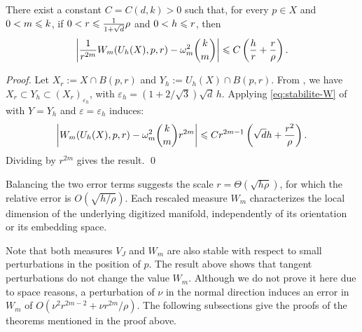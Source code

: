 \begin{theorem}
\label{thm:main}
There exist a constant $C=C(d,k)>0$ such that, for every $p \in X$ and $0<m\leqslant k$, if $0<r\leqslant \frac{1}{1+\sqrt{d}}\rho$ and $0<h\leqslant r$, then
\begin{align}\label{eq:main}
  \left| \frac{1}{r^{2m}}W_m(U_h(X),p,r) - \omega_m^2\binom{k}{m} \right|
  \leqslant  C \left( \frac{h}{r} + \frac{r}{\rho} \right).
\end{align}
\end{theorem}
\begin{proof}
  Let $X_r:= X \cap B(p,r)$ and $Y_h:=U_h(X) \cap
  B(p,r)$. From , we have $X_r
  \subset Y_h \subset (X_r)_{\varepsilon_h}$, with
  $\varepsilon_h=(1+2/\sqrt{3})\sqrt d\,h$. Applying \eqref{eq:stabilite-W} of
   with $Y=Y_h$ and
  $\varepsilon=\varepsilon_h$ induces:
  \begin{equation*}
    \left| W_m(U_h(X),p,r)-\omega_m^2\binom{k}{m}r^{2m} \right|
    \leqslant C r^{2m-1} \left( \sqrt{d} h+\frac{r^2}{\rho} \right).
  \end{equation*}
  Dividing by $r^{2m}$ gives the result.
  \qed
\end{proof}
Balancing the two error terms suggests the scale
$r=\Theta(\sqrt{h\rho})$, for which the relative error is
$O(\sqrt{h/\rho})$. Each rescaled measure $W_m$ characterizes the local
dimension of the underlying digitized manifold, independently of its
orientation or its embedding space.


Note that both measures $V_J$ and $W_m$ are also stable with respect
to small perturbations in the position of $p$. The result above shows
that tangent perturbations do not change the value $W_m$. Although we
do not prove it here due to space reasons, a perturbation of $\nu$ in
the normal direction induces an error in $W_m$ of $O(\nu^2
r^{2m-2}+\nu r^{2m} / \rho)$. The following subsections give the
proofs of the theorems mentioned in the proof above.


